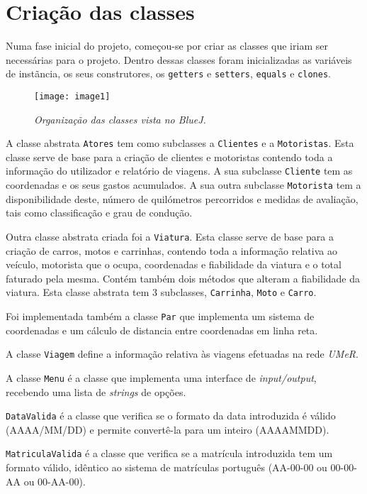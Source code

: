 \documentclass[a4paper,12pt]{report}
\begin{document}
\section{Criação das classes}

Numa fase inicial do projeto, começou-se por criar as classes que iriam ser necessárias para o projeto. Dentro dessas classes foram inicializadas as variáveis de instãncia, os seus construtores, os {\tt getters} e {\tt setters}, {\tt equals} e {\tt clones}.

\begin{figure}[h]
	\centering
	\texttt{[image: image1]}
	\caption{\small\sl Organização das classes vista no {\sl BlueJ}.}
	\captionsetup[figure]{list=yes}
\end{figure}

A classe abstrata {\tt Atores} tem como subclasses a {\tt Clientes} e a {\tt Motoristas}. Esta classe serve de base para a criação de clientes e motoristas contendo toda a informação do utilizador e relatório de viagens. A sua subclasse {\tt Cliente} tem as coordenadas e os seus gastos acumulados. A sua outra subclasse {\tt Motorista} tem a disponibilidade deste, número de quilómetros percorridos e medidas de avaliação, tais como classificação e grau de condução.

Outra classe abstrata criada foi a {\tt Viatura}. Esta classe serve de base para a criação de carros, motos e carrinhas, contendo toda a informação relativa ao veículo, motorista que o ocupa, coordenadas e fiabilidade da viatura e o total faturado pela mesma. Contém também dois métodos que alteram a fiabilidade da viatura.
Esta classe abstrata tem 3 subclasses, {\tt Carrinha}, {\tt Moto} e {\tt Carro}.

Foi implementada também a classe {\tt Par} que implementa um sistema de coordenadas e um cálculo de distancia entre coordenadas em linha reta. 

A classe {\tt Viagem} define a informação relativa às viagens efetuadas na rede {\sl UMeR}.

A classe {\tt Menu} é a classe que implementa uma interface de {\sl input/output}, recebendo uma lista de {\sl strings} de opções.

{\tt DataValida} é a classe que verifica se o formato da data introduzida é válido (AAAA/MM/DD) e permite convertê-la para um inteiro (AAAAMMDD).

{\tt MatriculaValida} é a classe que verifica se a matrícula introduzida tem um formato válido, idêntico ao sistema de matrículas português (AA-00-00 ou 00-00-AA ou 00-AA-00).
\end{document}
